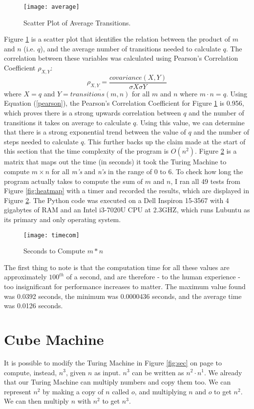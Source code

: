 \documentclass[a4paper,12pt]{article}
\begin{document}
\begin{figure}[H]
	\centering
	\texttt{[image: average]}
	\caption{Scatter Plot of Average Transitions.}
	\label{fig:averages}
\end{figure}
Figure \ref{fig:averages} is a scatter plot that identifies the relation between the product of $m$ and $n$ (i.e. $q$), and the average number of transitions needed to calculate $q$. The correlation between these variables was calculated using Pearson's Correlation Coefficient $\rho_{X,Y}$:
\begin{equation}
\rho_{X,Y} = \frac{covariance(X,Y)}{\sigma X \sigma Y}
\label{pearson}
\end{equation}
where $X = q$ and $Y = \overline{transitions(m,n)}$ for all $m$ and $n$ where $m \cdot n = q$.
\newline
Using Equation (\ref{pearson}), the Pearson's Correlation Coefficient for Figure \ref{fig:averages} is 0.956, which proves there is a strong upwards correlation between $q$ and the number of transitions it takes on average to calculate $q$. Using this value, we can determine that there is a strong exponential trend between the value of $q$ and the number of steps needed to calculate $q$. This further backs up the claim made at the start of this section that the time complexity of the program is $O(n^2)$.
Figure \ref{fig:timemap} is a matrix that maps out the time (in seconds) it took the Turing Machine to compute $m\times n$ for all \textit{m's} and \textit{n's} in the range of 0 to 6.
\newline
To check how long the program actually takes to compute the sum of $m$ and $n$, I ran all 49 tests from Figure \ref{fig:heatmap} with a timer and recorded the results, which are displayed in Figure \ref{fig:timemap}.
The Python code was executed on a Dell Inspiron 15-3567 with 4 gigabytes of RAM and an Intel i3-7020U CPU at 2.3GHZ, which runs Lubuntu as its primary and only operating system.

\begin{figure}[H]
	\centering
	\texttt{[image: timecom]}
	\caption{Seconds to Compute $m*n$}
	\label{fig:timemap}
\end{figure}
The first thing to note is that the computation time for all these values are approximately $100^{th}$ of a second, and are therefore - to the human experience - too insignificant for performance increases to matter.
The maximum value found was 0.0392 seconds, the minimum was 0.0000436 seconds, and the average time was 0.0126 seconds.
\newpage
\section{Cube Machine}
It is possible to modify the Turing Machine in Figure \ref{fig:sec} on page \pageref{fig:sec} to compute, instead, $n^3$, given $n$ as input.
$n^3$ can be written as $n^2 \cdot n^1$. We already that our Turing Machine can multiply numbers and copy them too. We can represent $n^2$ by making a copy of $n$ called $o$, and multiplying $n$ and $o$ to get $n^2$. We can then multiply $n$ with $n^2$ to get $n^3$.
\end{document}
